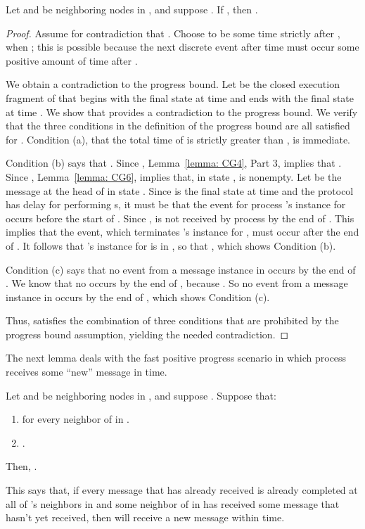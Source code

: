 \begin{lemma}
\label{lemma: CG5}
Let  and  be neighboring nodes in , and suppose .
If , then .
\end{lemma}

\begin{proof}
Assume for contradiction that .
Choose  to be some time strictly after ,
when ;
this is possible because the next discrete event after time  must occur some positive amount of time after .

We obtain a contradiction to the progress bound.
Let  be the closed execution fragment of  that begins
with the final state  at time  and ends with the final state
 at time .
We show that  provides a contradiction to the progress
bound.  We verify that the three conditions in the definition of the
progress bound are all satisfied for .  Condition (a), that
the total time of  is strictly greater than ,
is immediate.

Condition (b) says that .
Since , Lemma~\ref{lemma: CG4}, Part 3, implies
that .
Since , Lemma~\ref{lemma: CG6},
implies
that, in state ,  is nonempty.
Let  be the message at the head of  in state .
Since  is the final state at time  and the protocol has 
delay for performing s, it must be that the  event for
process 's instance for  occurs before the start of .
Since ,  is not received by process  by the
end of .
This implies that the  event, which terminates 's
instance for , must occur after the end of .
It follows that 's instance for  is in ,
so that , which shows Condition
(b).

Condition (c) says that no  event from a message instance in
 occurs by the end of .
We know that no  occurs by the end of , because .
So no  event from a message instance in 
occurs by the end of , which shows Condition (c).

Thus,  satisfies the combination of three conditions that
are prohibited by the progress bound assumption, yielding the needed
contradiction.
\end{proof}




The next lemma deals with the fast positive progress scenario in which  process  receives some ``new'' message in  time.
\begin{lemma}
Let  and  be neighboring nodes in , and suppose . Suppose that:
\begin{enumerate}
\item  for every neighbor  of  in .
\item .
\end{enumerate}

Then,  .
\label{lemma: z-neighborhood prog bound}
\end{lemma}
This says that, if every message that  has already received is already completed at all of 's
neighbors in  and some neighbor  of  in  has received some message that  hasn't yet received, then  will
receive a new message within  time.


